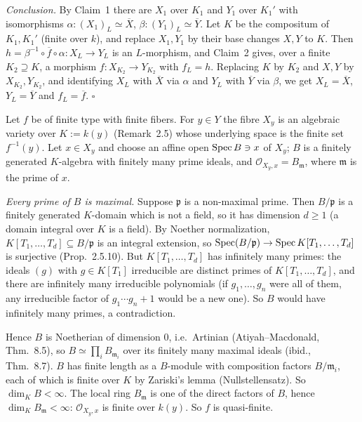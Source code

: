 \documentclass[11pt]{article}
\begin{document}
\emph{Conclusion.} By Claim~1 there are $X_1$ over $K_1$ and $Y_1$ over $K_1'$ with isomorphisms $\alpha:(X_1)_L\simeq\overline X$, $\beta:(Y_1)_L\simeq\overline Y$. Let $K$ be the compositum of $K_1,K_1'$ (finite over $k$), and replace $X_1,Y_1$ by their base changes $X,Y$ to $K$. Then $h=\beta^{-1}\circ\overline f\circ\alpha:X_L\to Y_L$ is an $L$-morphism, and Claim~2 gives, over a finite $K_2\supseteq K$, a morphism $f:X_{K_2}\to Y_{K_2}$ with $f_L=h$. Replacing $K$ by $K_2$ and $X,Y$ by $X_{K_2},Y_{K_2}$, and identifying $X_L$ with $\overline X$ via $\alpha$ and $Y_L$ with $\overline Y$ via $\beta$, we get $X_L=\overline X$, $Y_L=\overline Y$ and $f_L=\overline f$. \hfill$\square$

\pf
Let $f$ be of finite type with finite fibers. For $y\in Y$ the fibre $X_y$ is an algebraic variety over $K:=k(y)$ (Remark~2.5) whose underlying space is the finite set $f^{-1}(y)$. Let $x\in X_y$ and choose an affine open $\operatorname{Spec} B\ni x$ of $X_y$; $B$ is a finitely generated $K$-algebra with finitely many prime ideals, and $\mathcal O_{X_y,x}=B_{\mathfrak m}$, where $\mathfrak m$ is the prime of $x$.

\emph{Every prime of $B$ is maximal.} Suppose $\mathfrak p$ is a non-maximal prime. Then $B/\mathfrak p$ is a finitely generated $K$-domain which is not a field, so it has dimension $d\ge1$ (a domain integral over $K$ is a field). By Noether normalization, $K[T_1,\dots,T_d]\subseteq B/\mathfrak p$ is an integral extension, so $\operatorname{Spec}(B/\mathfrak p)\to\operatorname{Spec} K[T_1,\dots,T_d]$ is surjective (Prop.~2.5.10). But $K[T_1,\dots,T_d]$ has infinitely many primes: the ideals $(g)$ with $g\in K[T_1]$ irreducible are distinct primes of $K[T_1,\dots,T_d]$, and there are infinitely many irreducible polynomials (if $g_1,\dots,g_n$ were all of them, any irreducible factor of $g_1\cdots g_n+1$ would be a new one). So $B$ would have infinitely many primes, a contradiction.

Hence $B$ is Noetherian of dimension $0$, i.e.\ Artinian (Atiyah--Macdonald, Thm.~8.5), so $B\simeq\prod_iB_{\mathfrak m_i}$ over its finitely many maximal ideals (ibid., Thm.~8.7). $B$ has finite length as a $B$-module with composition factors $B/\mathfrak m_i$, each of which is finite over $K$ by Zariski's lemma (Nullstellensatz). So $\dim_KB<\infty$. The local ring $B_{\mathfrak m}$ is one of the direct factors of $B$, hence $\dim_KB_{\mathfrak m}<\infty$: $\mathcal O_{X_y,x}$ is finite over $k(y)$. So $f$ is quasi-finite.
\end{document}
